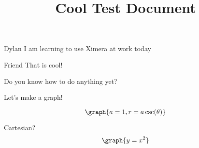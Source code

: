 \documentclass{ximera}
\title{Cool Test Document}
\begin{document}
\begin{dialogue}
\item[Dylan] I am learning to use Ximera at work today
\item[Friend] That is cool!
\end{dialogue}

\begin{question}

Do you know how to do anything yet?
\begin{multipleChoice}




\end{multipleChoice}

\end{question}

Let's make a graph!

\[
\graph{a=1,r=a \csc(\theta)}
\]

Cartesian?
\[
\graph{y=x^2}
\]
\end{document}
